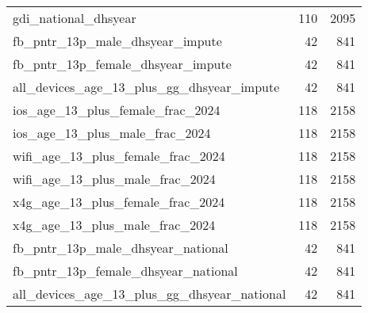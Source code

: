 \begin{table}[ht]
\begin{tabular}{lrr}
  gdi\_national\_dhsyear & 110 & 2095 \\ 
  fb\_pntr\_13p\_male\_dhsyear\_impute & 42 & 841 \\ 
  fb\_pntr\_13p\_female\_dhsyear\_impute & 42 & 841 \\ 
  all\_devices\_age\_13\_plus\_gg\_dhsyear\_impute & 42 & 841 \\ 
  ios\_age\_13\_plus\_female\_frac\_2024 & 118 & 2158 \\ 
  ios\_age\_13\_plus\_male\_frac\_2024 & 118 & 2158 \\ 
  wifi\_age\_13\_plus\_female\_frac\_2024 & 118 & 2158 \\ 
  wifi\_age\_13\_plus\_male\_frac\_2024 & 118 & 2158 \\ 
  x4g\_age\_13\_plus\_female\_frac\_2024 & 118 & 2158 \\ 
  x4g\_age\_13\_plus\_male\_frac\_2024 & 118 & 2158 \\ 
  fb\_pntr\_13p\_male\_dhsyear\_national & 42 & 841 \\ 
  fb\_pntr\_13p\_female\_dhsyear\_national & 42 & 841 \\ 
  all\_devices\_age\_13\_plus\_gg\_dhsyear\_national & 42 & 841 \\ 
   \hline
\end{tabular}
\end{table}
